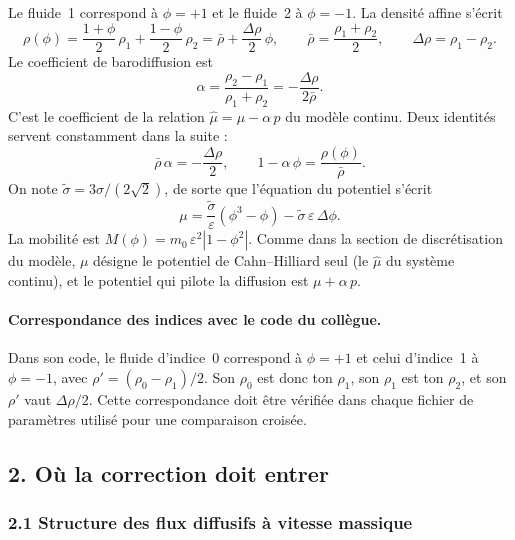 Le fluide~1 correspond à $\phi=+1$ et le fluide~2 à $\phi=-1$. La densité affine s'écrit
\begin{equation}\label{cp:rho}
  \rho(\phi) = \frac{1+\phi}{2}\,\rho_1 + \frac{1-\phi}{2}\,\rho_2
  = \bar{\rho} + \frac{\Delta\rho}{2}\,\phi,
  \qquad
  \bar{\rho} = \frac{\rho_1+\rho_2}{2},
  \qquad
  \Delta\rho = \rho_1-\rho_2 .
\end{equation}
Le coefficient de barodiffusion est
\begin{equation}\label{cp:alpha}
  \alpha = \frac{\rho_2-\rho_1}{\rho_1+\rho_2} = -\frac{\Delta\rho}{2\bar{\rho}} .
\end{equation}
C'est le coefficient de la relation $\hat{\mu} = \mu - \alpha\,p$ du modèle continu. Deux identités servent constamment dans la suite :
\begin{equation}\label{cp:id}
  \bar{\rho}\,\alpha = -\frac{\Delta\rho}{2},
  \qquad
  1-\alpha\,\phi = \frac{\rho(\phi)}{\bar{\rho}} .
\end{equation}
On note $\tilde{\sigma} = 3\sigma/(2\sqrt{2})$, de sorte que l'équation du potentiel s'écrit
\begin{equation}
  \mu = \frac{\tilde{\sigma}}{\varepsilon}\left(\phi^{3}-\phi\right) - \tilde{\sigma}\,\varepsilon\,\Delta\phi .
\end{equation}
La mobilité est $M(\phi) = m_0\,\varepsilon^{2}\left|1-\phi^{2}\right|$. Comme dans la section de discrétisation du modèle, $\mu$ désigne le potentiel de Cahn--Hilliard seul (le $\hat{\mu}$ du système continu), et le potentiel qui pilote la diffusion est $\mu + \alpha\,p$.

\paragraph{Correspondance des indices avec le code du collègue.} Dans son code, le fluide d'indice~0 correspond à $\phi=+1$ et celui d'indice~1 à $\phi=-1$, avec $\rho' = (\rho_0-\rho_1)/2$. Son $\rho_0$ est donc ton $\rho_1$, son $\rho_1$ est ton $\rho_2$, et son $\rho'$ vaut $\Delta\rho/2$. Cette correspondance doit être vérifiée dans chaque fichier de paramètres utilisé pour une comparaison croisée.

\subsection*{2. Où la correction doit entrer}

\subsubsection*{2.1 Structure des flux diffusifs à vitesse massique}

